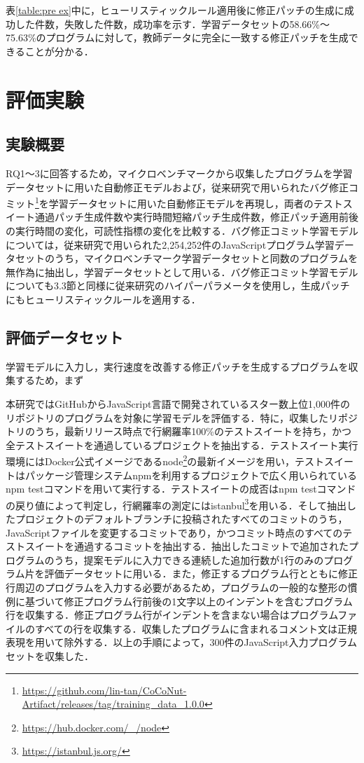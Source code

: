 \documentclass[submit,ses,noauthor]{ipsj}
\begin{document}
表\ref{table:pre ex}中に，ヒューリスティックルール適用後に修正パッチの生成に成功した件数，失敗した件数，成功率を示す．学習データセットの58.66\%〜75.63\%のプログラムに対して，教師データに完全に一致する修正パッチを生成できることが分かる．


\section{評価実験}\label{sec:evaluation}

\subsection{実験概要}

RQ1〜3に回答するため，マイクロベンチマークから収集したプログラムを学習データセットに用いた自動修正モデルおよび，従来研究で用いられたバグ修正コミット\footnote{\url{https://github.com/lin-tan/CoCoNut-Artifact/releases/tag/training_data_1.0.0}}を学習データセットに用いた自動修正モデルを再現し，両者のテストスイート通過パッチ生成件数や実行時間短縮パッチ生成件数，修正パッチ適用前後の実行時間の変化，可読性指標の変化を比較する．バグ修正コミット学習モデルについては，従来研究で用いられた2,254,252件のJavaScriptプログラム学習データセットのうち，マイクロベンチマーク学習データセットと同数のプログラムを無作為に抽出し，学習データセットとして用いる．バグ修正コミット学習モデルについても3.3節と同様に従来研究のハイパーパラメータを使用し，生成パッチにもヒューリスティックルールを適用する．


\subsection{評価データセット}

学習モデルに入力し，実行速度を改善する修正パッチを生成するプログラムを収集するため，まず

本研究ではGitHubからJavaScript言語で開発されているスター数上位1,000件のリポジトリのプログラムを対象に学習モデルを評価する．特に，収集したリポジトリのうち，最新リリース時点で行網羅率100\%のテストスイートを持ち，かつ全テストスイートを通過しているプロジェクトを抽出する．テストスイート実行環境にはDocker公式イメージであるnode\footnote{\url{https://hub.docker.com/_/node}}の最新イメージを用い，テストスイートはパッケージ管理システムnpmを利用するプロジェクトで広く用いられているnpm testコマンドを用いて実行する．テストスイートの成否はnpm testコマンドの戻り値によって判定し，行網羅率の測定にはistanbul\footnote{\url{https://istanbul.js.org/}}を用いる．そして抽出したプロジェクトのデフォルトブランチに投稿されたすべてのコミットのうち，JavaScriptファイルを変更するコミットであり，かつコミット時点のすべてのテストスイートを通過するコミットを抽出する．抽出したコミットで追加されたプログラムのうち，提案モデルに入力できる連続した追加行数が1行のみのプログラム片を評価データセットに用いる．また，修正するプログラム行とともに修正行周辺のプログラムを入力する必要があるため，プログラムの一般的な整形の慣例に基づいて修正プログラム行前後の1文字以上のインデントを含むプログラム行を収集する．修正プログラム行がインデントを含まない場合はプログラムファイルのすべての行を収集する．収集したプログラムに含まれるコメント文は正規表現を用いて除外する．以上の手順によって，300件のJavaScript入力プログラムセットを収集した．
\end{document}
